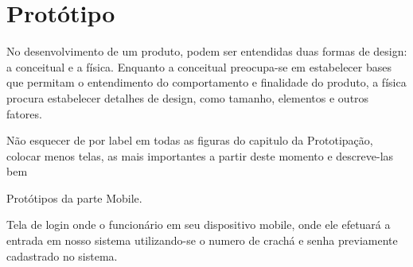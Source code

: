\chapter{Protótipo}
No desenvolvimento de um produto, podem ser entendidas
duas formas de design: a conceitual e a física. Enquanto a
conceitual preocupa-se em estabelecer bases que permitam o
entendimento do comportamento e finalidade do produto, a
física procura estabelecer detalhes de design, como tamanho,
elementos e outros fatores.\cite{medeiros2013importancia}


{\color{red} Não esquecer de por label em todas as figuras do capitulo da Prototipação, colocar menos telas, as mais importantes  a partir deste momento e descreve-las bem}

\begin{center}
	Protótipos da parte Mobile.
\end{center}

Tela de login onde o funcionário em seu dispositivo mobile, onde ele efetuará a entrada em nosso sistema utilizando-se o numero de crachá e senha previamente cadastrado no sistema.


